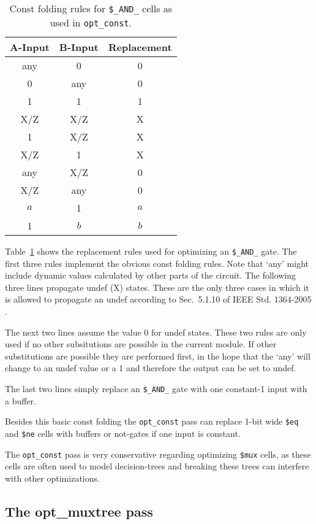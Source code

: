 \begin{table}
	\hfil
	\begin{tabular}{cc|c}
		A-Input & B-Input & Replacement \\
		\hline
		any &   0 &   0 \\
		  0 & any &   0 \\
		  1 &   1 &   1 \\
		\hline
		X/Z & X/Z &   X \\
		  1 & X/Z &   X \\
		X/Z &   1 &   X \\
		\hline
		any & X/Z &   0 \\
		X/Z & any &   0 \\
		\hline
		$a$ &   1 & $a$ \\
		  1 & $b$ & $b$ \\
	\end{tabular}
	\caption{Const folding rules for {\tt\$\_AND\_} cells as used in {\tt opt\_const}.}
	\label{tab:opt_const_and}
\end{table}

Table~\ref{tab:opt_const_and} shows the replacement rules used for optimizing
an {\tt\$\_AND\_} gate. The first three rules implement the obvious const folding
rules. Note that `any' might include dynamic values calculated by other parts
of the circuit. The following three lines propagate undef (X) states.
These are the only three cases in which it is allowed to propagate an undef
according to Sec.~5.1.10 of IEEE Std. 1364-2005 \cite{Verilog2005}.

The next two lines assume the value 0 for undef states. These two rules are only
used if no other subsitutions are possible in the current module. If other substitutions
are possible they are performed first, in the hope that the `any' will change to
an undef value or a 1 and therefore the output can be set to undef.

The last two lines simply replace an {\tt\$\_AND\_} gate with one constant-1
input with a buffer.

Besides this basic const folding the {\tt opt\_const} pass can replace 1-bit wide
{\tt \$eq} and {\tt \$ne} cells with buffers or not-gates if one input is constant.

The {\tt opt\_const} pass is very conservative regarding optimizing {\tt \$mux} cells,
as these cells are often used to model decision-trees and breaking these trees can
interfere with other optimizations.

\subsection{The opt\_muxtree pass}

